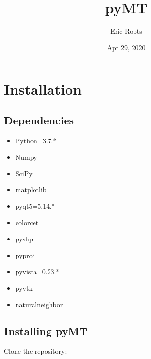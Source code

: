 \documentclass[letterpaper,10pt,english]{sphinxmanual}
\title{pyMT}
\date{Apr 29, 2020}
\author{Eric Roots}
\begin{document}
\pagestyle{empty}
\sphinxmaketitle
\pagestyle{plain}
\sphinxtableofcontents
\pagestyle{normal}
\label{\detokenize{index::doc}}



\chapter{Installation}
\label{\detokenize{content/api_core/installation:installation}}\label{\detokenize{content/api_core/installation::doc}}

\section{Dependencies}
\label{\detokenize{content/api_core/installation:dependencies}}\begin{itemize}
\item {} 
Python=3.7.*

\item {} 
Numpy

\item {} 
SciPy

\item {} 
matplotlib

\item {} 
pyqt5=5.14.*

\item {} 
colorcet

\item {} 
pyshp

\item {} 
pyproj

\item {} 
pyvista=0.23.*

\item {} 
pyvtk

\item {} 
naturalneighbor

\end{itemize}


\section{Installing pyMT}
\label{\detokenize{content/api_core/installation:installing-pymt}}
Clone the repository:

\begin{sphinxVerbatim}[commandchars=\\\{\}]
  
\end{sphinxVerbatim}
\end{document}
